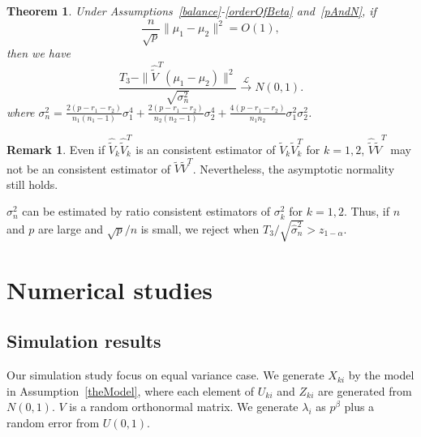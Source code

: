 \documentclass[review]{elsarticle}
\theoremstyle{plain}
\newtheorem{theorem}{\quad\quad Theorem}
\theoremstyle{definition}
\newtheorem{remark}{\quad\quad Remark}
\theoremstyle{remark}
\begin{document}
\begin{theorem}\label{myXiaopanpan}
    Under Assumptions~\ref{balance}-\ref{orderOfBeta} and~\ref{pAndN},
     if 
    $$\frac{n}{\sqrt{p}}\|\mu_1-\mu_2\|^2=O(1),$$
     then we have
\begin{equation*}
    \frac{T_3-\|\hat{\tilde{V}}^T(\mu_1-\mu_2)\|^2}{\sqrt{\sigma_n^2}}\xrightarrow{\mathcal{L}} N(0,1).
\end{equation*}
where
$\sigma_n^2=\frac{2(p-r_1-r_2)}{n_1(n_1-1)}\sigma_1^4+\frac{2(p-r_1-r_2)}{n_2(n_2-1)}\sigma_2^4+\frac{4(p-r_1-r_2)}{n_1n_2}\sigma_1^2\sigma_2^2$.
\end{theorem}
\begin{remark}
    Even if $\hat{\tilde{V}}_k\hat{\tilde{V}}_k^T$ is an consistent estimator of $\tilde{V}_k\tilde{V}_k^T$ for $k=1,2$, $\hat{\tilde{V}}\hat{\tilde{V}}^T$ may not be an consistent estimator of $\tilde{V}\tilde{V}^T$.
    Nevertheless, the asymptotic normality still holds.
\end{remark}

 $\sigma_n^2$ can be estimated by ratio consistent estimators of $\sigma^2_k$ for $k=1,2$. Thus, if $n$ and $p$ are large and ${\sqrt{p}}/{n}$ is small, we reject when $T_3/\sqrt{\hat{\sigma}_n^2}>z_{1-\alpha}$. 




\section{Numerical studies}
\subsection{Simulation results}

Our simulation study focus on equal variance case. 
We generate $X_{ki}$ by the model in Assumption~\ref{theModel}, where each element of $U_{ki}$ and $Z_{ki}$ are generated from $N(0,1)$.
$V$ is a random orthonormal matrix. 
We generate $\lambda_i$ as $p^{\beta}$ plus a random error from $U(0,1)$.
\end{document}
